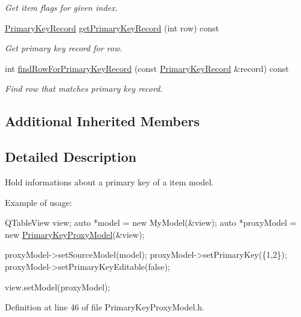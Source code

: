 \begin{DoxyCompactItemize}
\begin{DoxyCompactList}\small\item\em Get item flags for given index. \end{DoxyCompactList}\item 
\hyperlink{class_mdt_1_1_item_model_1_1_primary_key_record}{Primary\+Key\+Record} \hyperlink{class_mdt_1_1_item_model_1_1_primary_key_proxy_model_aed26b58c40b2285ccab159f820454763}{get\+Primary\+Key\+Record} (int row) const 
\begin{DoxyCompactList}\small\item\em Get primary key record for row. \end{DoxyCompactList}\item 
int \hyperlink{class_mdt_1_1_item_model_1_1_primary_key_proxy_model_a8ebe6766659d3e3f0e640f71b8cd3673}{find\+Row\+For\+Primary\+Key\+Record} (const \hyperlink{class_mdt_1_1_item_model_1_1_primary_key_record}{Primary\+Key\+Record} \&record) const 
\begin{DoxyCompactList}\small\item\em Find row that matches primary key record. \end{DoxyCompactList}\end{DoxyCompactItemize}
\subsection*{Additional Inherited Members}


\subsection{Detailed Description}
Hold informations about a primary key of a item model. 

Example of usage\+: 
\begin{DoxyCode}
QTableView view;
\textcolor{keyword}{auto} *model = \textcolor{keyword}{new} MyModel(&view);
\textcolor{keyword}{auto} *proxyModel = \textcolor{keyword}{new} \hyperlink{class_mdt_1_1_item_model_1_1_primary_key_proxy_model_a38f37907461e93ff3b495913670a81e4}{PrimaryKeyProxyModel}(&view);

proxyModel->setSourceModel(model);
proxyModel->setPrimaryKey(\{1,2\});
proxyModel->setPrimaryKeyEditable(\textcolor{keyword}{false});

view.setModel(proxyModel);
\end{DoxyCode}
 

Definition at line 46 of file Primary\+Key\+Proxy\+Model.\+h.



